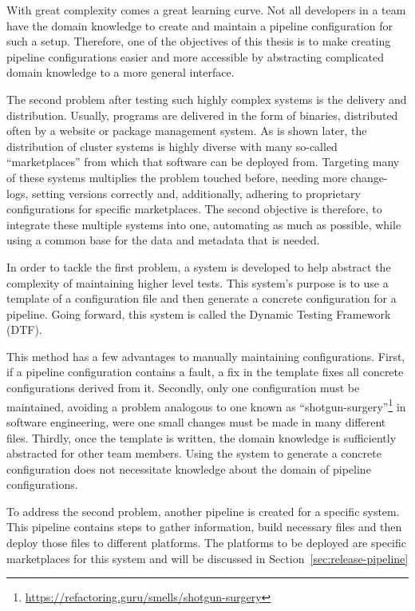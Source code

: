 With great complexity comes a great learning curve.
Not all developers in a team have the domain knowledge to create and maintain a pipeline configuration for such a setup.
Therefore, one of the objectives of this thesis is to make creating pipeline configurations easier and more accessible by abstracting complicated domain knowledge to a more general interface.

The second problem after testing such highly complex systems is the delivery and distribution.
Usually, programs are delivered in the form of binaries, distributed often by a website or package management system.
As is shown later, the distribution of cluster systems is highly diverse with many so-called ``marketplaces'' from which that software can be deployed from.
Targeting many of these systems multiplies the problem touched before, needing more change-logs, setting versions correctly and, additionally, adhering to proprietary configurations for specific marketplaces.
The second objective is therefore, to integrate these multiple systems into one, automating as much as possible, while using a common base for the data and metadata that is needed.

In order to tackle the first problem, a system is developed to help abstract the complexity of maintaining higher level tests.
This system's purpose is to use a template of a configuration file and then generate a concrete configuration for a pipeline.
Going forward, this system is called the Dynamic Testing Framework (DTF).

\pagebreak

This method has a few advantages to manually maintaining configurations.
First, if a pipeline configuration contains a fault, a fix in the template fixes all concrete configurations derived from it.
Secondly, only one configuration must be maintained, avoiding a problem analogous to one known as ``shotgun-surgery''\footnote{\url{https://refactoring.guru/smells/shotgun-surgery}} in software engineering, were one small changes must be made in many different files.
Thirdly, once the template is written, the domain knowledge is sufficiently abstracted for other team members.
Using the system to generate a concrete configuration does not necessitate knowledge about the domain of pipeline configurations.

To address the second problem, another pipeline is created for a specific system.
This pipeline contains steps to gather information, build necessary files and then deploy those files to different platforms.
The platforms to be deployed are specific marketplaces for this system and will be discussed in Section~\ref{sec:release-pipeline}

